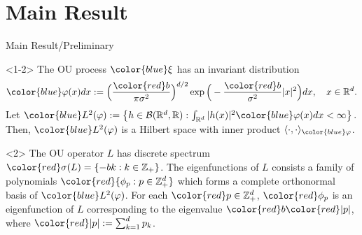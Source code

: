 \documentclass[xcolor=dvipsnames]{beamer}
\begin{document}
\section{Main Result}
\begin{frame}{Main Result/Preliminary}
\begin{block}{}<1-2>
The OU process ${\color{blue}\xi}$ has an invariant distribution
$$
    {\color{blue}\varphi(x)}dx
    :=\Big (\frac{{\color{red}b}}{\pi \sigma^2}\Big )^{d/2}\exp \Big(-\frac{{\color{red}b}}{\sigma^2}|x|^2 \Big)dx,
    \quad x\in \mathbb R^d.
$$
    Let ${\color{blue}L^2(\varphi)}:= \left\{ h  \in \mathcal B(\mathbb R^d, \mathbb R): \int_{\mathbb R^d} |h(x)|^2 {\color{blue}\varphi(x)} dx < \infty \right\}$.
        Then, ${\color{blue}L^2(\varphi)}$ is a Hilbert space with inner product $\langle \cdot, \cdot \rangle_{\color{blue}\varphi}$.
\end{block}

\begin{block}{}<2>
The OU operator $L$ has discrete spectrum
$\color{red}\sigma(L)= \{-bk: k \in \mathbb Z_+\}$.
The eigenfunctions of $L$ consists a family of polynomials $\color{red}\{\phi_p:p\in \mathbb Z_+^d\}$ which forms a complete orthonormal basis of ${\color{blue}L^2(\varphi)}$.
For each $\color{red}p\in \mathbb Z_+^d$, 
${\color{red}\phi_p}$ is an eigenfunction of $L$ corresponding to the eigenvalue ${\color{red}b}{\color{red}|p|}$, where $\color{red}|p|:= \sum_{k=1}^d p_k$. 
\end{block}
\end{frame}
\end{document}
